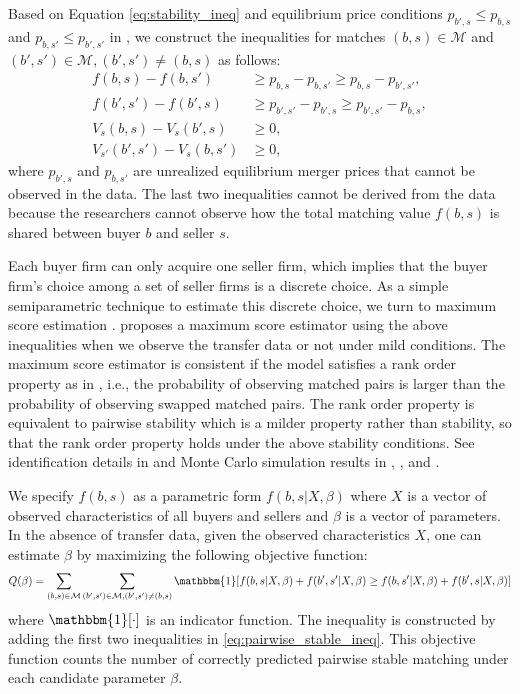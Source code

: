 \documentclass[10pt]{article}
\begin{document}
Based on Equation \eqref{eq:stability_ineq} and equilibrium price conditions $p_{b',s}\le p_{b,s}$ and $p_{b,s'}\le p_{b',s'}$ in \cite{akkus2015ms}, we construct the inequalities for matches $(b,s)\in \mathcal{M}$ and $(b',s')\in \mathcal{M}, (b',s')\neq(b,s)$ as follows:
\begin{align}
    f(b,s)-f(b,s')&\ge p_{b,s}-p_{b,s'}\ge p_{b,s}-p_{b',s'},\label{eq:pairwise_stable_ineq}\\
    f(b',s')-f(b',s)&\ge p_{b',s'}-p_{b',s}\ge p_{b',s'}-p_{b,s},\nonumber\\
    V_s(b,s)-V_s(b',s)&\ge 0,\nonumber\\
    V_{s'}(b',s')-V_s(b,s')&\ge 0,\nonumber
\end{align}
where $p_{b',s}$ and $p_{b,s'}$ are unrealized equilibrium merger prices that cannot be observed in the data. The last two inequalities cannot be derived from the data because the researchers cannot observe how the total matching value $f(b,s)$ is shared between buyer $b$ and seller $s$.

Each buyer firm can only acquire one seller firm, which implies that the buyer firm’s
choice among a set of seller firms is a discrete choice. 
As a simple semiparametric technique to estimate this discrete choice, we turn to maximum score estimation \cite{manski1975maximum,manski1985semiparametric}.
\cite{fox2018qe} proposes a maximum score
estimator using the above inequalities when we observe the transfer data or not under mild conditions. 
The maximum score estimator is consistent if the model satisfies a rank order property as in \cite{manski1975maximum,manski1985semiparametric}, i.e., the probability of observing matched pairs is larger than the probability of observing swapped matched pairs. 
The rank order property is equivalent to pairwise stability which is a milder property rather than stability, so that the rank order property holds under the above stability conditions. See identification details in \cite{fox2010qe} and Monte Carlo simulation results in \cite{fox2018qe}, \cite{akkus2015ms}, and \cite{otani2021matching_cost}.

We specify $f(b,s)$ as a parametric form $f(b,s|X,\beta)$ where $X$ is a vector of observed characteristics of all buyers and sellers and $\beta$ is a vector of parameters. 
In the absence of transfer data, given the observed characteristics $X$, one can estimate $\beta$ by maximizing the following objective function:
\begin{align}
    Q(\beta)=\sum_{(b,s)\in \mathcal{M}} \sum_{(b',s')\in \mathcal{M},(b',s')\neq (b,s)} \mathbbm{1}[f(b,s|X,\beta)+ f(b',s'|X,\beta)\ge f(b,s'|X,\beta)+f(b',s|X,\beta)]\label{eq:score_function}
\end{align}
where $\mathbbm{1}[\cdot]$ is an indicator function. 
The inequality is constructed by adding the first two inequalities in \eqref{eq:pairwise_stable_ineq}.
This objective function counts the number of correctly predicted pairwise stable matching under each candidate parameter $\beta$.
\end{document}
